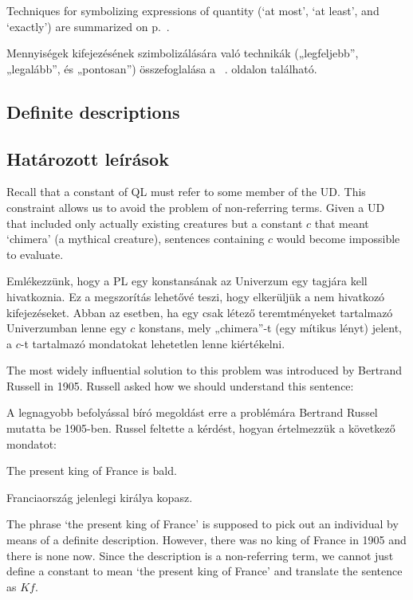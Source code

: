 Techniques for symbolizing expressions of quantity (`at most', `at least', and `exactly') are summarized on p.~\pageref{summary.atleast}.

Mennyiségek kifejezésének szimbolizálására való technikák („legfeljebb”, „legalább”, és „pontosan”) összefoglalása a ~\pageref{summary.atleast}. oldalon található.



\subsection*{Definite descriptions}
\subsection{Határozott leírások}

\label{subsec.defdesc}
Recall that a constant of QL must refer to some member of the UD. This constraint allows us to avoid the problem of non-referring terms. Given a UD that included only actually existing creatures but a constant $c$ that meant `chimera' (a mythical creature), sentences containing $c$ would become impossible to evaluate.

Emlékezzünk, hogy a PL egy konstansának az Univerzum egy tagjára kell hivatkoznia. Ez a megszorítás lehetővé teszi, hogy elkerüljük a nem hivatkozó kifejezéseket. Abban az esetben, ha egy csak létező teremtményeket tartalmazó Univerzumban lenne egy $c$ konstans, mely „chimera”-t (egy mítikus lényt) jelent, a $c$-t tartalmazó mondatokat lehetetlen lenne kiértékelni.

The most widely influential solution to this problem was introduced by Bertrand Russell in 1905. Russell asked how we should understand this sentence:

A legnagyobb befolyással bíró megoldást erre a problémára Bertrand Russel mutatta be 1905-ben. Russel feltette a kérdést, hogyan értelmezzük a következő mondatot:
\begin{earg}
\item[\ex{defdesc1}] The present king of France is bald.
\end{earg}
\begin{earg}
\item[\ex{defdesc1}] Franciaország jelenlegi királya kopasz.
\end{earg}
The phrase `the present king of France' is supposed to pick out an individual by means of a definite description. However, there was no king of France in 1905 and there is none now. Since the description is a non-referring term, we cannot just define a constant to mean `the present king of France' and translate the sentence as $Kf$.

